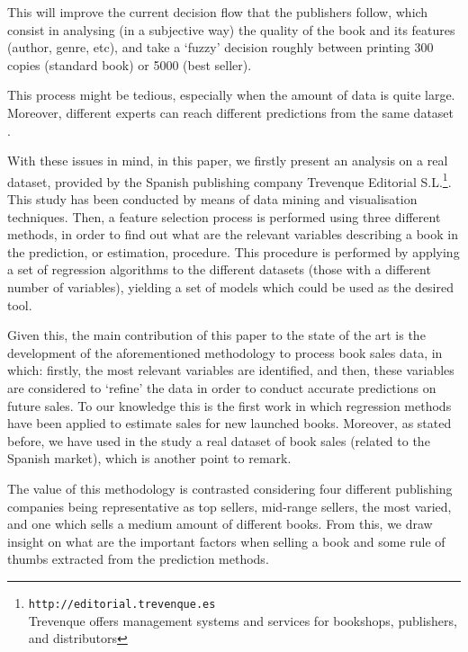 \documentclass[a4paper,10pt,twocolumn,preprint,3p]{elsarticle}
\begin{document}
This will improve the current decision flow that the publishers follow, which consist in analysing (in a subjective way) the quality of the book and its features (author, genre, etc), and take a `fuzzy' decision roughly between printing 300 copies (standard book) or 5000 (best seller).

This process might be tedious, especially when the amount of data is quite large. Moreover, different experts can reach different predictions from the same dataset \cite{Sanders1994}. 

With these issues in mind, in this paper, we firstly present an analysis on a real dataset, provided by the Spanish publishing company Trevenque Editorial S.L.\footnote{{\tt http://editorial.trevenque.es}\\ Trevenque offers management systems and services for bookshops, publishers, and distributors}.
This study has been conducted by means of data mining and visualisation techniques. Then, a feature selection process is performed using three different methods, in order to find out what are the relevant variables describing a book in the prediction, or estimation, procedure. 
This procedure is performed by applying a set of regression algorithms to the different datasets (those with a different number of variables), yielding a set of models which could be used as the desired tool. 

Given this, the main contribution of this paper to the state of the art is the development of the aforementioned methodology to process book sales data, in which: firstly, the most relevant variables are identified, and then, these variables are considered to `refine' the data in order to conduct accurate predictions on future sales. To our knowledge this is the first work in which regression methods have been applied to estimate sales for new launched books. Moreover, as stated before, we have used in the study a real dataset of book sales (related to the Spanish market), which is another point to remark.

The value of this methodology is contrasted considering four different
publishing companies being representative as top sellers, mid-range
sellers, the most varied, and one which sells a medium amount of
different books. From this, we draw insight on what are the important
factors when selling a book and some rule of thumbs extracted from the
prediction methods.
\end{document}

